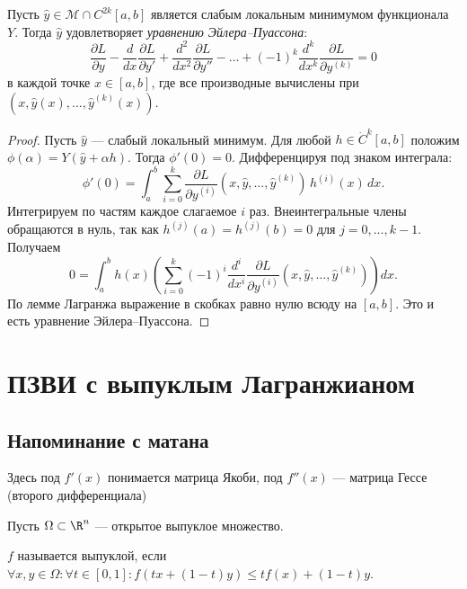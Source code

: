 \begin{theorem}
    Пусть \(\hat{y}\in\mathcal{M}\cap C^{2k}[a,b]\) является слабым локальным минимумом функционала \(Y\). Тогда \(\hat{y}\) удовлетворяет \textit{уравнению Эйлера–Пуассона}:
    \[
    \frac{\partial L}{\partial y} - \frac{d}{dx}\frac{\partial L}{\partial y'} + \frac{d^2}{dx^2}\frac{\partial L}{\partial y''} - \dots + (-1)^k\frac{d^k}{dx^k}\frac{\partial L}{\partial y^{(k)}} = 0
    \]
    в каждой точке \(x\in[a,b]\), где все производные вычислены при \((x,\hat{y}(x),\dots,\hat{y}^{(k)}(x))\).
\end{theorem}
\begin{proof}
    Пусть $\hat{y}$ — слабый локальный минимум. Для любой $h\in\dot{C}^k[a,b]$ положим $\phi(\alpha)=Y(\hat{y}+\alpha h)$. Тогда $\phi'(0)=0$. Дифференцируя под знаком интеграла:
    \[
    \phi'(0)=\int_a^b \sum_{i=0}^k \frac{\partial L}{\partial y^{(i)}}(x,\hat{y},\dots,\hat{y}^{(k)})\,h^{(i)}(x)\,dx.
    \]
    Интегрируем по частям каждое слагаемое $i$ раз. Внеинтегральные члены обращаются в нуль, так как $h^{(j)}(a)=h^{(j)}(b)=0$ для $j=0,\dots,k-1$. Получаем
    \[
    0=\int_a^b h(x)\left( \sum_{i=0}^k (-1)^i\frac{d^i}{dx^i}\frac{\partial L}{\partial y^{(i)}}(x,\hat{y},\dots,\hat{y}^{(k)}) \right)dx.
    \]
    По лемме Лагранжа выражение в скобках равно нулю всюду на $[a,b]$. Это и есть уравнение Эйлера–Пуассона.
\end{proof}


\section{ПЗВИ с выпуклым Лагранжианом}

\subsection{Напоминание с матана}
\begin{note}
    Здесь под \(f'(x)\) понимается матрица Якоби, под \(f''(x)\) --- матрица Гессе (второго дифференциала)
\end{note}

Пусть \(\Omega \subset \R^n\) --- открытое выпуклое множество.
\begin{definition}
    \(f\) называется выпуклой, если \(\forall x, y \in \Omega: \forall t \in [0, 1]: f(tx + (1 - t)y) \le tf(x) + (1 - t)y\).
\end{definition}

